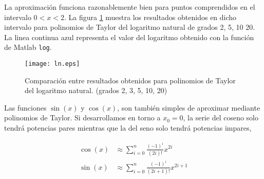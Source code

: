 
\begin{paracol}{2}
La aproximación funciona razonablemente bien para puntos comprendidos en el intervalo $0<x<2$. La figura \ref{fig:ln} muestra los resultados obtenidos en dicho intervalo para polinomios de Taylor del logaritmo natural de grados 2, 5, 10 20. La linea continua azul representa el valor del logaritmo obtenido con la función de Matlab \texttt{log}.
\end{paracol}
\begin{figure}[h]
\centering
\texttt{[image: ln.eps]}
\caption{Comparación entre resultados obtenidos para polinomios de Taylor del logaritmo natural. (grados 2, 3, 5, 10, 20)}
\label{fig:ln}
\end{figure}
\begin{paracol}{2}
Las funciones $\sin(x)$ y $\cos(x)$, son también simples de aproximar mediante polinomios de Taylor. Si desarrollamos en torno a $x_0=0$, la serie del coseno solo tendrá potencias pares mientras que la del seno solo tendrá potencias impares,
\end{paracol}
\begin{align*}
\cos(x)&\approx \sum_{i=0}^n \frac{(-1)^i}{(2i)!}x^{2i}\\
\sin(x)&\approx \sum_{i=0}^n \frac{(-1)^i}{(2i+1)!}x^{2i+1}
\end{align*}

